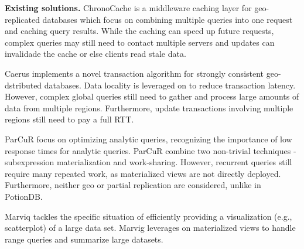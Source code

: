 \documentclass[sigplan,twocolumn,review,anonymous]{acmart}
\begin{document}
\noindent
\textbf{Existing solutions.}
ChronoCache \cite{chronocache} is a middleware caching layer for geo-replicated databases which focus on combining multiple queries into one request and caching query results.
While the caching can speed up future requests, complex queries may still need to contact multiple servers and updates can invalidade the cache or else clients read stale data.

Caerus \cite{hildred2023caerus} implements a novel transaction algorithm for strongly consistent geo-dstributed databases.
Data locality is leveraged on to reduce transaction latency.
However, complex global queries still need to gather and process large amounts of data from multiple regions.
Furthermore, update transactions involving multiple regions still need to pay a full RTT.

ParCuR \cite{sioulas2023real} focus on optimizing analytic queries, recognizing the importance of low response times for analytic queries.
ParCuR combine two non-trivial techniques - subexpression materialization and work-sharing.
However, recurrent queries still require many repeated work, as materialized views are not directly deployed. 
Furthermore, neither geo or partial replication are considered, unlike in PotionDB.




Marviq \cite{marviq} tackles the specific situation of efficiently providing a visualization (e.g., scatterplot) of a large data set.
Marvig leverages on materialized views to handle range queries and summarize large datasets.
\end{document}
